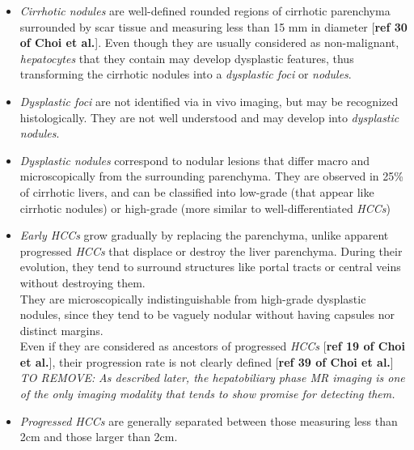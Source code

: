 \documentclass[]{article}
\begin{document}
\begin{itemize}
\item
  \emph{Cirrhotic nodules} are well-defined rounded regions of cirrhotic
  parenchyma surrounded by scar tissue and measuring less than 15 mm in
  diameter {[}\textbf{ref 30 of Choi et al.}{]}. Even though they are
  usually considered as non-malignant, \emph{hepatocytes} that they
  contain may develop dysplastic features, thus transforming the
  cirrhotic nodules into a \emph{dysplastic foci} or \emph{nodules}. 
\item
  \emph{Dysplastic foci} are not identified via in vivo imaging, but may
  be recognized histologically. They are not well understood and may
  develop into \emph{dysplastic nodules}. 
\item
  \emph{Dysplastic nodules} correspond to nodular lesions that differ
  macro and microscopically from the surrounding parenchyma. They are
  observed in 25\% of cirrhotic livers, and can be classified into
  low-grade (that appear like cirrhotic nodules) or high-grade (more
  similar to well-differentiated \emph{HCCs})
\item
  \emph{Early HCCs} grow gradually by replacing the parenchyma, unlike
  apparent progressed \emph{HCCs} that displace or destroy the liver
  parenchyma. During their evolution, they tend to surround structures
  like portal tracts or central veins without destroying them.\\
  They are microscopically indistinguishable from high-grade dysplastic
  nodules, since they tend to be vaguely nodular without having capsules
  nor distinct margins.\\
  Even if they are considered as ancestors of progressed \emph{HCCs}
  {[}\textbf{ref 19 of Choi et al.}{]}, their progression rate is not
  clearly defined {[}\textbf{ref 39 of Choi et al.}{]}\\
  \emph{TO REMOVE:} \emph{As described later, the hepatobiliary phase MR
  imaging is one of the only imaging modality that tends to show promise
  for detecting them.}
\item
  \emph{Progressed HCCs} are generally separated between those measuring
  less than 2cm and those larger than 2cm.


\end{itemize}
\end{document}
